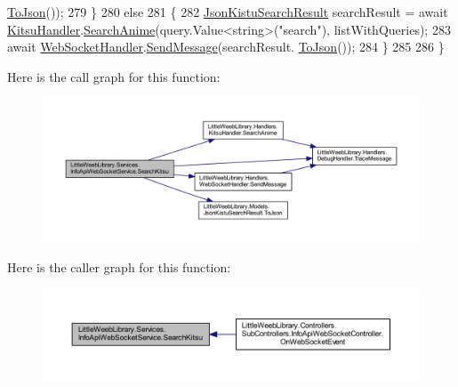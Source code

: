 \begin{DoxyCode}
      \mbox{\hyperlink{class_little_weeb_library_1_1_models_1_1_json_kistu_search_result_a6adca32faf08b7fb63c9f469ab3fbcae}{ToJson}}());
279             \}
280             \textcolor{keywordflow}{else}
281             \{
282                 \mbox{\hyperlink{class_little_weeb_library_1_1_models_1_1_json_kistu_search_result}{JsonKistuSearchResult}} searchResult = await 
      \mbox{\hyperlink{class_little_weeb_library_1_1_handlers_1_1_kitsu_handler}{KitsuHandler}}.\mbox{\hyperlink{class_little_weeb_library_1_1_handlers_1_1_kitsu_handler_a92f121e8fec8cce5ffe0454d3a17c156}{SearchAnime}}(query.Value<\textcolor{keywordtype}{string}>(\textcolor{stringliteral}{"search"}), listWithQueries);
283                 await \mbox{\hyperlink{class_little_weeb_library_1_1_handlers_1_1_web_socket_handler}{WebSocketHandler}}.\mbox{\hyperlink{class_little_weeb_library_1_1_handlers_1_1_web_socket_handler_a1de289d54d665a32c93478c68d3e6ad0}{SendMessage}}(searchResult.
      \mbox{\hyperlink{class_little_weeb_library_1_1_models_1_1_json_kistu_search_result_a6adca32faf08b7fb63c9f469ab3fbcae}{ToJson}}());
284             \}
285 
286         \}
\end{DoxyCode}
Here is the call graph for this function\+:\nopagebreak
\begin{figure}[H]
\begin{center}
\leavevmode
\includegraphics[width=350pt]{class_little_weeb_library_1_1_services_1_1_info_api_web_socket_service_af6678c62bfe074bc5ce399ff21641d6e_cgraph}
\end{center}
\end{figure}
Here is the caller graph for this function\+:\nopagebreak
\begin{figure}[H]
\begin{center}
\leavevmode
\includegraphics[width=350pt]{class_little_weeb_library_1_1_services_1_1_info_api_web_socket_service_af6678c62bfe074bc5ce399ff21641d6e_icgraph}
\end{center}
\end{figure}
